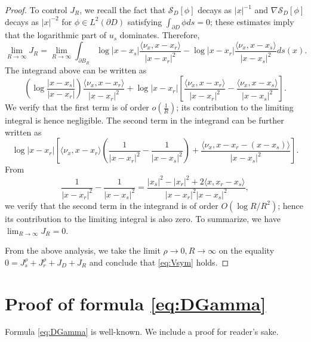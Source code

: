 \begin{proof}
To control $J_R$, we recall the fact that $\mathcal{S}_D[\phi]$
decays as $|x|^{-1}$ and $\nabla \mathcal{S}_D[\phi]$ decays as
$|x|^{-2}$ for $\phi \in L^2(\partial D)$ satisfying
$\int_{\partial D} \phi ds = 0$; these estimates imply that the
logarithmic part of $u_s$ dominates. Therefore,
\begin{equation*}
\lim_{R \to \infty} J_R = \lim_{R \to \infty} \int_{\partial B_R}
\log|x-x_s| \frac{\langle \nu_x, x-x_r\rangle}{|x-x_r|^2} -
\log|x-x_r| \frac{\langle \nu_x, x-x_s\rangle}{|x-x_s|^2} ds(x).
\end{equation*}
The integrand above can be written as
\begin{equation*}
\left(\log \frac{|x-x_s|}{|x-x_r|}\right) \frac{\langle \nu_x, x -
x_r\rangle}{|x-x_r|^2} + \log|x-x_r| \left[ \frac{\langle \nu_x, x
- x_r\rangle}{|x-x_r|^2} - \frac{\langle \nu_x, x -
x_s\rangle}{|x-x_s|^2}\right].
\end{equation*}
We verify that the first term is of order $o(\frac{1}{R})$; its
contribution to the limiting integral is hence negligible. The
second term in the integrand can be further written as
\begin{equation*}
\log|x-x_r| \left[ \langle \nu_x, x - x_r \rangle
\left(\frac{1}{|x - x_r|^2} - \frac{1}{|x-x_s|^2}\right) +
\frac{\langle \nu_x, x - x_r - (x - x_s)\rangle}{|x-x_s|^2}
\right].
\end{equation*}
From
\begin{equation*}
\frac{1}{|x - x_r|^2} - \frac{1}{|x-x_s|^2} = \frac{|x_s|^2 -
|x_r|^2 + 2\langle x, x_r - x_s \rangle}{|x - x_r|^2 |x-x_s|^2},
\end{equation*}
we verify that the second term in the integrand is of order
$O(\log R/R^2)$; hence its contribution to the limiting integral
is also zero. To summarize, we have $\lim_{R \to \infty} J_R = 0$.

From the above analysis, we take the limit $\rho \to 0, R \to
\infty$ on the equality $0 = J^\rho_s + J^\rho_r + J_D + J_R$ and
conclude that \eqref{eq:Vsym} holds.
\end{proof}



\section{Proof of formula \eqref{eq:DGamma}}
\label{sec:app2} Formula \eqref{eq:DGamma} is well-known. We
include a proof for reader's sake.

